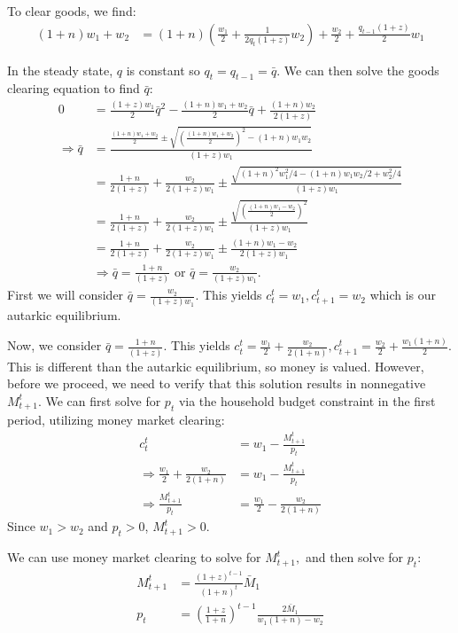 \documentclass[11pt]{article} %
\begin{document}
To clear goods, we find:
\begin{align*}
(1+n)w_1 + w_2 &= (1+n)\left(\frac{w_1}{2} + \frac{1}{2q_t(1+z)}w_2\right)+ \frac{w_2}{2} + \frac{q_{t-1}(1+z)}{2}w_1
\end{align*}

In the steady state, $q$ is constant so $q_t = q_{t-1} = \bar{q}.$ We can then solve the goods clearing equation to find $\bar{q}$:
\begin{align*}
0 &=\frac{(1+z)w_1}{2}\bar{q}^2 -\frac{(1+n)w_1 + w_2}{2}\bar{q} + \frac{(1+n)w_2}{2(1+z)}\\
\Rightarrow \bar{q} &= \frac{\frac{(1+n)w_1 + w_2}{2} \pm \sqrt{(\frac{(1+n)w_1 + w_2}{2})^2 -(1+n)w_1w_2 } }{(1+z)w_1}\\
&= \frac{1+n}{2(1+z)} + \frac{w_2}{2(1+z)w_1} \pm \frac{\sqrt{(1+n)^2w_1^2/4 - (1+n)w_1w_2/2 + w_2^2/4} }{(1+z)w_1} \\
&= \frac{1+n}{2(1+z)} + \frac{w_2}{2(1+z)w_1} \pm \frac{\sqrt{(\frac{(1+n)w_1 - w_2}{2})^2} }{(1+z)w_1} \\
&= \frac{1+n}{2(1+z)} + \frac{w_2}{2(1+z)w_1} \pm \frac{(1+n)w_1 - w_2}{2(1+z)w_1}\\
&\Rightarrow \bar{q} = \frac{1+n}{(1+z)} \text{ or } \bar{q} = \frac{w_2}{(1+z)w_1}. %
\end{align*}
First we will consider $\bar{q} = \frac{w_2}{(1+z)w_1}.$ This yields $c_t^t = w_1, c_{t+1}^t = w_2$ which is our autarkic equilibrium.

Now, we consider $\bar{q} = \frac{1+n}{(1+z)}$. This yields $c_t^t = \frac{w_1}{2} + \frac{w_2}{2(1+n)}, c_{t+1}^t = \frac{w_2}{2} + \frac{w_1(1+n)}{2}$. This is different than the autarkic equilibrium, so money is valued. However, before we proceed, we need to verify that this solution results in nonnegative $M_{t+1}^t$. We can first solve for $p_t$ via the household budget constraint in the first period, utilizing money market clearing:
\begin{align*}
c_t^t &= w_1 - \frac{M_{t+1}^t}{p_t} \\
 \Rightarrow \frac{w_1}{2} + \frac{w_2}{2(1+n)} &= w_1 - \frac{M_{t+1}^t}{p_t} \\
\Rightarrow \frac{M_{t+1}^t}{p_t} &= \frac{w_1}{2}- \frac{w_2}{2(1+n)}
\end{align*}
Since $w_1>w_2$ and $p_t>0$, $M_{t+1}^t>0.$

We can use money market clearing to solve for $M_{t+1}^t,$ and then solve for $p_t$:
\begin{align*}
M_{t+1}^t &= \frac{(1+z)^{t-1}}{(1+n)^t}\bar{M}_1\\
p_t &= \left( \frac{1+z}{1+n}\right)^{t-1} \frac{2\bar{M}_1}{w_1(1+n) - w_2}
\end{align*}
\end{document}
